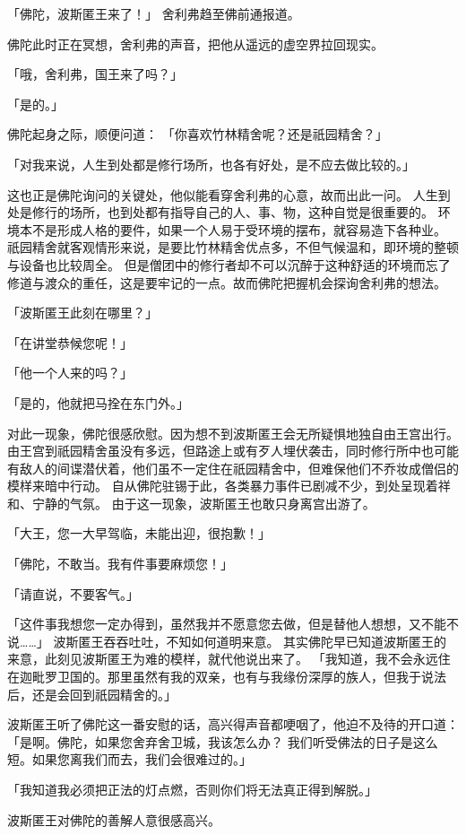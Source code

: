 \documentclass[twoside,openany]{book}
\begin{document}
「佛陀，波斯匿王来了！」
舍利弗趋至佛前通报道。

佛陀此时正在冥想，舍利弗的声音，把他从遥远的虚空界拉回现实。

「哦，舍利弗，国王来了吗？」

「是的。」

佛陀起身之际，顺便问道：
「你喜欢竹林精舍呢？还是祇园精舍？」

「对我来说，人生到处都是修行场所，也各有好处，是不应去做比较的。」

这也正是佛陀询问的关键处，他似能看穿舍利弗的心意，故而出此一问。
人生到处是修行的场所，也到处都有指导自己的人、事、物，这种自觉是很重要的。
环境本不是形成人格的要件，如果一个人易于受环境的摆布，就容易造下各种业。
祇园精舍就客观情形来说，是要比竹林精舍优点多，不但气候温和，即环境的整顿与设备也比较周全。
但是僧团中的修行者却不可以沉醉于这种舒适的环境而忘了修道与渡众的重任，这是要牢记的一点。故而佛陀把握机会探询舍利弗的想法。

「波斯匿王此刻在哪里？」

「在讲堂恭候您呢！」

「他一个人来的吗？」

「是的，他就把马拴在东门外。」

对此一现象，佛陀很感欣慰。因为想不到波斯匿王会无所疑惧地独自由王宫出行。
由王宫到祇园精舍虽没有多远，但路途上或有歹人埋伏袭击，同时修行所中也可能有敌人的间谍潜伏着，他们虽不一定住在祇园精舍中，但难保他们不乔妆成僧侣的模样来暗中行动。
自从佛陀驻锡于此，各类暴力事件已剧减不少，到处呈现着祥和、宁静的气氛。
由于这一现象，波斯匿王也敢只身离宫出游了。

「大王，您一大早驾临，未能出迎，很抱歉！」

「佛陀，不敢当。我有件事要麻烦您！」

「请直说，不要客气。」

「这件事我想您一定办得到，虽然我并不愿意您去做，但是替他人想想，又不能不说……」
波斯匿王吞吞吐吐，不知如何道明来意。
其实佛陀早已知道波斯匿王的来意，此刻见波斯匿王为难的模样，就代他说出来了。
「我知道，我不会永远住在迦毗罗卫国的。那里虽然有我的双亲，也有与我缘份深厚的族人，但我于说法后，还是会回到祇园精舍的。」

波斯匿王听了佛陀这一番安慰的话，高兴得声音都哽咽了，他迫不及待的开口道：
「是啊。佛陀，如果您舍弃舍卫城，我该怎么办？
我们听受佛法的日子是这么短。如果您离我们而去，我们会很难过的。」

「我知道我必须把正法的灯点燃，否则你们将无法真正得到解脱。」

波斯匿王对佛陀的善解人意很感高兴。
\end{document}
